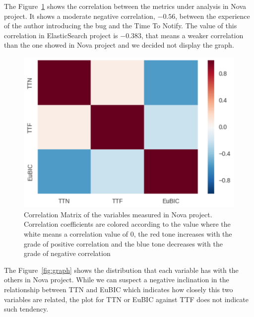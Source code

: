 \documentclass[10pt, conference]{IEEEtran}
\begin{document}
The Figure~\ref{fig:correlation} shows the correlation between the metrics under analysis in Nova project. It shows a moderate negative correlation, $-0.56$, between the experience of the author introducing the bug and the Time To Notify. The value of this correlation in ElasticSearch project is $-0.383$, that means a weaker correlation than the one showed in Nova project and we decided not display the graph.

\begin{figure}[ht]
\centering
\includegraphics[width=\columnwidth]{correlationMatrix.png}
\caption{Correlation Matrix of the variables measured in Nova project. Correlation coefficients are colored according to the value where the white means a correlation value of 0, the red tone increases with the grade of positive correlation and the blue tone decreases with the grade of negative correlation }
\label{fig:correlation}       %
\end{figure}

The Figure~\ref{fig:graph} shows the distribution that each variable has with the others in Nova project. While we can suspect a negative inclination in the relationship between TTN and EuBIC which indicates how closely this two variables are related, the plot for TTN or EuBIC against TTF does not indicate such tendency.
\end{document}
